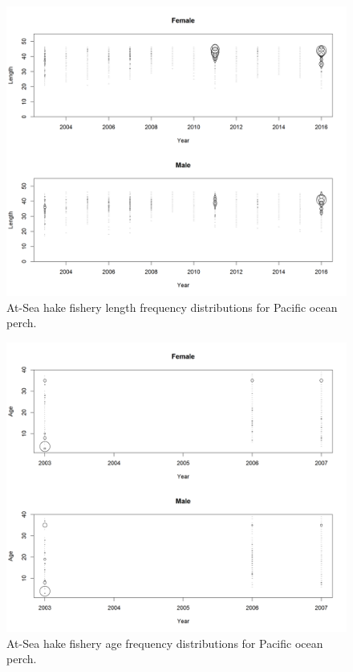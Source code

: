 \documentclass[12pt,]{article}
\begin{document}
\begin{figure}
\centering
\includegraphics{Figures/ASHOP_lengths.png}
\caption{At-Sea hake fishery length frequency distributions for Pacific
ocean perch. \label{fig:ASHOP_Length}}
\end{figure}

\begin{figure}
\centering
\includegraphics{Figures/ASHOP_ages.png}
\caption{At-Sea hake fishery age frequency distributions for Pacific
ocean perch. \label{fig:ASHOP_Age}}
\end{figure}
\end{document}
